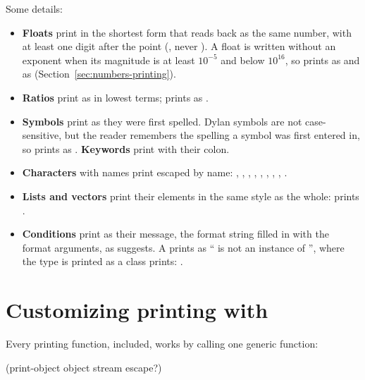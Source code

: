 \noindent
Some details:

\begin{itemize}
\item \textbf{Floats} print in the shortest form that reads back as the
  same number, with at least one digit after the point (,
  never ). A float is written without an exponent when its
  magnitude is at least $10^{-5}$ and below $10^{16}$, so
   prints as  and  as
   (Section~\ref{sec:numbers-printing}).
\item \textbf{Ratios} print as \code{/}
  in lowest terms;  prints as .
\item \textbf{Symbols} print as they were first spelled. Dylan symbols
  are not case-sensitive, but the reader remembers the spelling a symbol
  was first entered in, so  prints as 
  . \textbf{Keywords} print with their colon.
\item \textbf{Characters} with names print escaped by name:
  , ,
  , ,
  , ,
  , ,
  .
\item \textbf{Lists and vectors} print their elements in the same style
  as the whole:  prints
  .
\item \textbf{Conditions} print as their message, the format string
  filled in with the format arguments, as 
  suggests. A  prints as
  `` is not an instance of '', where the type is
  printed as a class prints: .
\end{itemize}

\section{Customizing printing with }\label{sec:printing-print-object}

Every printing function,  included, works by calling one
generic function:

\begin{dylan}
(print-object object stream escape?)
\end{dylan}

